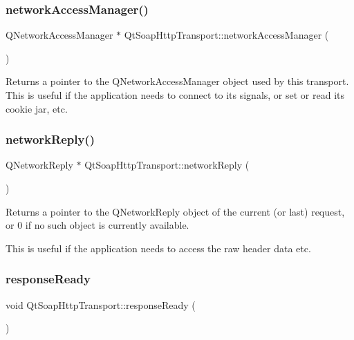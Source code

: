 \subsubsection{\texorpdfstring{network\+Access\+Manager()}{networkAccessManager()}}
{\footnotesize\ttfamily Q\+Network\+Access\+Manager $\ast$ Qt\+Soap\+Http\+Transport\+::network\+Access\+Manager (\begin{DoxyParamCaption}{ }\end{DoxyParamCaption})}

Returns a pointer to the Q\+Network\+Access\+Manager object used by this transport. This is useful if the application needs to connect to its signals, or set or read its cookie jar, etc. \mbox{\label{class_qt_soap_http_transport_a2cf74b91f101f37583e4013ee812ed20}} 
\subsubsection{\texorpdfstring{network\+Reply()}{networkReply()}}
{\footnotesize\ttfamily Q\+Network\+Reply $\ast$ Qt\+Soap\+Http\+Transport\+::network\+Reply (\begin{DoxyParamCaption}{ }\end{DoxyParamCaption})}

Returns a pointer to the Q\+Network\+Reply object of the current (or last) request, or 0 if no such object is currently available.

This is useful if the application needs to access the raw header data etc. \mbox{\label{class_qt_soap_http_transport_a51f909d36a83ee62e0b3dccff3e340cf}} 
\subsubsection{\texorpdfstring{response\+Ready}{responseReady}\hspace{0.1cm}{\footnotesize\ttfamily [1/2]}}
{\footnotesize\ttfamily void Qt\+Soap\+Http\+Transport\+::response\+Ready (\begin{DoxyParamCaption}{ }\end{DoxyParamCaption})\hspace{0.3cm}{\ttfamily [signal]}}

